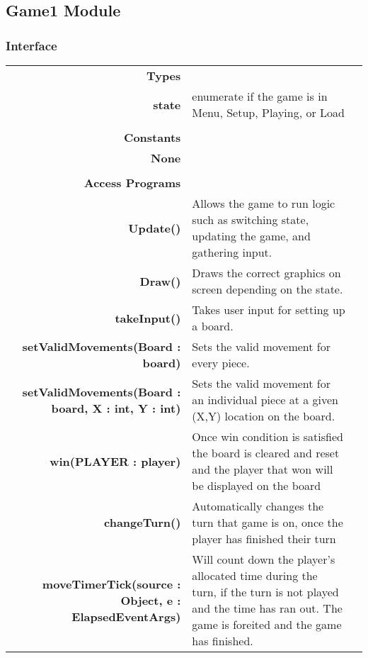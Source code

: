 \documentclass[10pt]{article}
\makeatletter
\newcommand{\CustomLabel}[1]{\Hy@raisedlink{\hypertarget{#1}{}}\label{#1}}
\makeatother
\begin{document}
    \subsection{Game1 Module}\CustomLabel{mis:Game1}
    \subsubsection{Interface}
        \begin{tabularx}{\linewidth}{@{} >{\bfseries}r Xp{5cm} }
            Types           & \begin{tabular}[t]{@{} l p{8cm}} 
                                     & \\
                                    state & enumerate if the game is in Menu, Setup, Playing, or Load \\
                              \end{tabular} \\
                              
            Constants       & \begin{tabular}[t]{@{} l p{8cm}} 
                                     & \\
                                    None & \\
                              \end{tabular} \\

            Access Programs & \begin{tabular}[t]{@{} p{4cm} p{8cm}}
                                     & \\
                                    Update() & Allows the game to run logic such as switching state, updating the game, and gathering input. \\
                                    Draw() & Draws the correct graphics on screen depending on the state. \\ 
                                    takeInput() & Takes user input for setting up a board. \\
                                    setValidMovements(Board : board) & Sets the valid movement for every piece. \\
                                    setValidMovements(Board : board, X : int, Y : int) & Sets the valid movement for an individual piece at a given (X,Y) location on the board. \\
                                    win(PLAYER : player) & Once win condition is satisfied the board is cleared and reset and the player that won will be displayed on the board \\
                                    changeTurn() & Automatically changes the turn that game is on, once the player has finished their turn\\
                                    moveTimerTick(source : Object, e : ElapsedEventArgs) & Will count down the player's allocated time during the turn, if the turn is not played and the time has ran out. The game is foreited and the game has finished.
                              \end{tabular}
        \end{tabularx}
        
\end{document}
